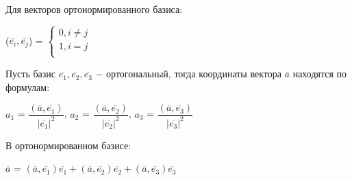 Для векторов ортонормированного базиса:
\begin{center}
    ($\overline{e_i}, \overline{e_j}$) = 
    $\begin{cases}
        0, i \neq  j\\
        1, i = j\\
    \end{cases}$
\end{center}

Пусть базис $\overline{e_1}, \overline{e_2}, \overline{e_3}$ $-$ ортогональный, тогда координаты вектора $\overline{a}$ находятся по формулам:

\begin{center}
    $a_1$ = $\dfrac{(\overline{a}, \overline{e_1})}{|\overline{e_1}|^2 }$, $a_2$ = $\dfrac{(\overline{a}, \overline{e_2})}{|\overline{e_2}|^2 }$, $a_3$ = $\dfrac{(\overline{a}, \overline{e_3})}{|\overline{e_3}|^2 }$
\end{center}

В ортонормированном базисе:

\begin{center}
    $\overline{a}$ = $(\overline{a}, \overline{e_1})\overline{e_1} + (\overline{a}, \overline{e_2})\overline{e_2} + (\overline{a}, \overline{e_3})\overline{e_3}$
\end{center}

